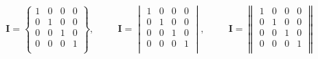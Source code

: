 \documentclass[a4paper,11pt]{article}
\begin{document}
	\begin{equation}
		\mathbf{I} = \begin{Bmatrix}
			1&0&0&0\\
			0&1&0&0\\
			0&0&1&0\\
			0&0&0&1\\
		\end{Bmatrix}, \qquad \ \ 
		\mathbf{I} = \begin{vmatrix}
			1&0&0&0\\
			0&1&0&0\\
			0&0&1&0\\
			0&0&0&1\\
		\end{vmatrix}, \qquad \ \ 
		\mathbf{I} = \begin{Vmatrix}
			1&0&0&0\\
			0&1&0&0\\
			0&0&1&0\\
			0&0&0&1\\
		\end{Vmatrix}  
	\end{equation}
\end{document}
